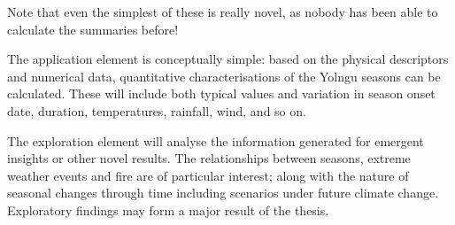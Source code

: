 Note that even the simplest of these is really novel, as nobody has
been able to calculate the summaries before!

The application element is conceptually simple:  based on the physical
descriptors and numerical data, quantitative characterisations of the
Yolngu seasons can be calculated.  These will include both typical values
and variation in season onset date, duration, temperatures, rainfall,
wind, and so on.

The exploration element will analyse the information generated for emergent
insights or other novel results.  The relationships between seasons, extreme
weather events and fire are of particular interest; along with the nature of
seasonal changes through time including scenarios under future climate change.
Exploratory findings may form a major result of the thesis.





